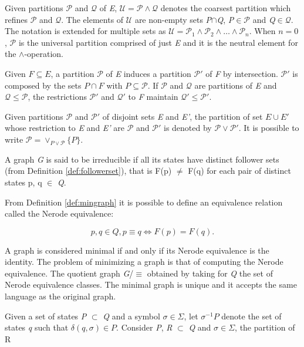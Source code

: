 {Given partitions $\mathcal{P}$ and $\mathcal{Q}$ of \textit{E}, $\mathcal{U} = \mathcal{P}\wedge\mathcal{Q}$ denotes the coarsest partition which refines $\mathcal{P}$ and $\mathcal{Q}$. The elements of $\mathcal{U}$ are non-empty sets \textit{P}$\cap$\textit{Q}, \textit{P}$\in\mathcal{P}$ and \textit{Q}$\in\mathcal{Q}$. The notation is extended for multiple sets as $\mathcal{U} = \mathcal{P}_1 \wedge \mathcal{P}_2 \wedge \ldots \wedge \mathcal{P}_n$. When $n=0$,  $\mathcal{P}$ is the universal partition comprised of just \textit{E} and it is the neutral element for the $\wedge$-operation.

Given $F\subseteq E$, a partition $\mathcal{P}$ of \textit{E} induces a partition $\mathcal{P}'$  
of \textit{F} by intersection. $\mathcal{P}'$ is composed by the sets $P\cap F$ with $P\subseteq \mathcal{P}$. If $\mathcal{P}$ and $\mathcal{Q}$ are partitions of \textit{E} and $\mathcal{Q} \leq \mathcal{P}$, the restrictions $\mathcal{P}'$ and $\mathcal{Q}'$ to \textit{F} maintain $\mathcal{Q}' \leq \mathcal{P}'$.

Given partitions $\mathcal{P}$ and $\mathcal{P}'$ of disjoint sets \textit{E} and \textit{E'}, the partition of set $E \cup E'$ whose restriction to \textit{E} and \textit{E'} are $\mathcal{P}$ and $\mathcal{P'}$ is denoted by $\mathcal{P}\vee\mathcal{P}'$. It is possible to write $\mathcal{P} = \vee_{P\vee\mathcal{P}}\{P\}$.

\begin{definition}\label{def:mingraph}
A graph \textit{G} is said to be irreducible if all its states have distinct follower sets (from Definition \ref{def:followerset}), that is F(p) $\neq$ F(q) for each pair of distinct states p, q $\in$ \textit{Q}.
\end{definition}

From Definition \ref{def:mingraph} it is possible to define an equivalence relation called the Nerode equivalence:

\[
p, q \in Q, p \equiv q \Leftrightarrow F(p) = F(q).
\]

A graph is considered minimal if and only if its Nerode equivalence is the identity. The problem of minimizing a graph is that of computing the Nerode equivalence. The quotient graph \textit{G}/$\equiv$ obtained by taking for \textit{Q} the set of Nerode equivalence classes. The minimal graph is unique and it accepts the same language as the original graph.

Given a set of states \textit{P} $\subset$  \textit{Q} and a symbol $\sigma \in \Sigma$, let $\sigma^{-1}\textit{P}$ denote the set of states \textit{q} such that $\delta(q, \sigma) \in P$. Consider \textit{P}, \textit{R} $\subset$ \textit{Q} and $\sigma \in \Sigma$, the partition of R

}

